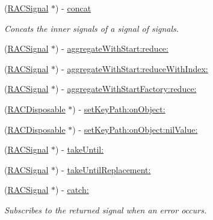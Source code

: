 \begin{DoxyCompactItemize}
(\mbox{\hyperlink{interface_r_a_c_signal}{R\+A\+C\+Signal}} $\ast$) -\/ \mbox{\hyperlink{category_r_a_c_signal_07_operations_08_a68bff1ad76f3dddda45dcf3dc98a1ae2}{concat}}
\begin{DoxyCompactList}\small\item\em Concats the inner signals of a signal of signals. \end{DoxyCompactList}\item 
(\mbox{\hyperlink{interface_r_a_c_signal}{R\+A\+C\+Signal}} $\ast$) -\/ \mbox{\hyperlink{category_r_a_c_signal_07_operations_08_a4b872b6c2322aa37f98282043e768582}{aggregate\+With\+Start\+:reduce\+:}}
\item 
(\mbox{\hyperlink{interface_r_a_c_signal}{R\+A\+C\+Signal}} $\ast$) -\/ \mbox{\hyperlink{category_r_a_c_signal_07_operations_08_a83c6fc367091505aa6721f1c6a58d65d}{aggregate\+With\+Start\+:reduce\+With\+Index\+:}}
\item 
(\mbox{\hyperlink{interface_r_a_c_signal}{R\+A\+C\+Signal}} $\ast$) -\/ \mbox{\hyperlink{category_r_a_c_signal_07_operations_08_a51c08c7a357f83c96c468a6aa13d4d87}{aggregate\+With\+Start\+Factory\+:reduce\+:}}
\item 
(\mbox{\hyperlink{interface_r_a_c_disposable}{R\+A\+C\+Disposable}} $\ast$) -\/ \mbox{\hyperlink{category_r_a_c_signal_07_operations_08_ada2a2f51a30fb8bef13819c50ebfbf85}{set\+Key\+Path\+:on\+Object\+:}}
\item 
(\mbox{\hyperlink{interface_r_a_c_disposable}{R\+A\+C\+Disposable}} $\ast$) -\/ \mbox{\hyperlink{category_r_a_c_signal_07_operations_08_a3d59cca19be3e985aa5a08cb0386faeb}{set\+Key\+Path\+:on\+Object\+:nil\+Value\+:}}
\item 
(\mbox{\hyperlink{interface_r_a_c_signal}{R\+A\+C\+Signal}} $\ast$) -\/ \mbox{\hyperlink{category_r_a_c_signal_07_operations_08_afb214e9e69dc34880b306c118b8e56d4}{take\+Until\+:}}
\item 
(\mbox{\hyperlink{interface_r_a_c_signal}{R\+A\+C\+Signal}} $\ast$) -\/ \mbox{\hyperlink{category_r_a_c_signal_07_operations_08_aa8536c9726338e10176997936be011ed}{take\+Until\+Replacement\+:}}
\item 
\mbox{\label{category_r_a_c_signal_07_operations_08_a34c8a85e28adb1f26fcd769de19bc5bb}} 
(\mbox{\hyperlink{interface_r_a_c_signal}{R\+A\+C\+Signal}} $\ast$) -\/ \mbox{\hyperlink{category_r_a_c_signal_07_operations_08_a34c8a85e28adb1f26fcd769de19bc5bb}{catch\+:}}
\begin{DoxyCompactList}\small\item\em Subscribes to the returned signal when an error occurs. \end{DoxyCompactList}\item 

\end{DoxyCompactItemize}
